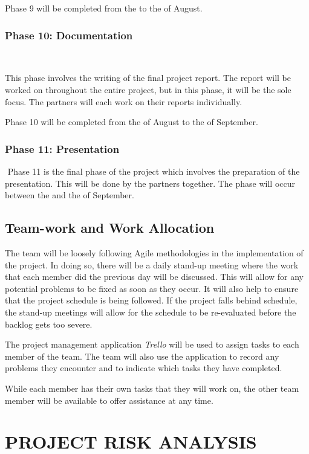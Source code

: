 \documentclass[10pt,twocolumn]{witseiepaper}
\begin{document}
Phase 9 will be completed from the  to the  of August.

\subsubsection*{Phase 10: Documentation} $    $

This phase involves the writing of the final project report. The report will be worked on throughout the entire project, but in this phase, it will be the sole focus. The partners will each work on their reports individually. 

Phase 10 will be completed from the  of August to the  of September.

\subsubsection*{Phase 11: Presentation} $    $
Phase 11 is the final phase of the project which involves the preparation of the presentation. This will be done by the partners together. The phase will occur between the  and the  of September.

\subsection{Team-work and Work Allocation}

The team will be loosely following Agile methodologies in the implementation of the project. In doing so, there will be a daily stand-up meeting where the work that each member did the previous day will be discussed. This will allow for any potential problems to be fixed as soon as they occur. It will also help to ensure that the project schedule is being followed. If the project falls behind schedule, the stand-up meetings will allow for the schedule to be re-evaluated before the backlog gets too severe.

The project management application \textit{Trello} will be used to assign tasks to each member of the team. The team will also use the application to record any problems they encounter and to indicate which tasks they have completed. 

While each member has their own tasks that they will work on, the other team member will be available to offer assistance at any time.

\section{PROJECT RISK ANALYSIS}
\end{document}
